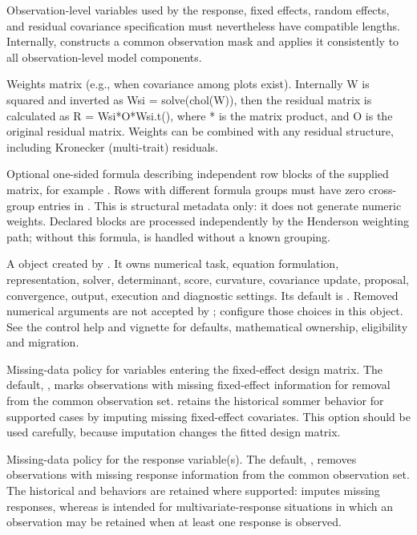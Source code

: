 \documentclass[a4paper]{book}
\begin{document}
\begin{Arguments}
\begin{ldescription}
Observation-level variables used by the response, fixed effects, random effects,
and residual covariance specification must nevertheless have compatible lengths.
Internally,  constructs a common observation mask and applies it
consistently to all observation-level model components.
\item[\code{W}] Weights matrix (e.g., when covariance among plots exist). Internally
W is squared and inverted as Wsi = solve(chol(W)), then the residual matrix
is calculated as R = Wsi*O*Wsi.t(), where * is the matrix product, and O 
is the original residual matrix. Weights can be combined with any residual
structure, including Kronecker (multi-trait) residuals.
\item[\code{weights}] Optional one-sided formula describing independent row blocks
of the supplied  matrix, for example . Rows
with different formula groups must have zero cross-group entries in .
This is structural metadata only: it does not generate numeric weights.
Declared blocks are processed independently by the Henderson weighting
path; without this formula,  is handled without a known grouping.
\item[\code{control}] A  object created by
. It owns numerical task, equation formulation,
representation, solver, determinant, score, curvature, covariance update,
proposal, convergence, output, execution and diagnostic settings. Its default
is . Removed numerical arguments are not accepted by
; configure those choices in this object. See the control help
and vignette for defaults, mathematical ownership, eligibility and migration.

\item[\code{naMethodX}] Missing-data policy for variables entering the fixed-effect
design matrix. The default, , marks observations with missing
fixed-effect information for removal from the common observation set.
 retains the historical sommer behavior for supported cases by
imputing missing fixed-effect covariates. This option should be used carefully,
because imputation changes the fitted design matrix.

\item[\code{naMethodY}] Missing-data policy for the response variable(s). The default,
, removes observations with missing response information from the
common observation set. The historical  and 
behaviors are retained where supported:  imputes missing responses,
whereas  is intended for multivariate-response situations in which
an observation may be retained when at least one response is observed.


\end{ldescription}
\end{Arguments}
\end{document}
